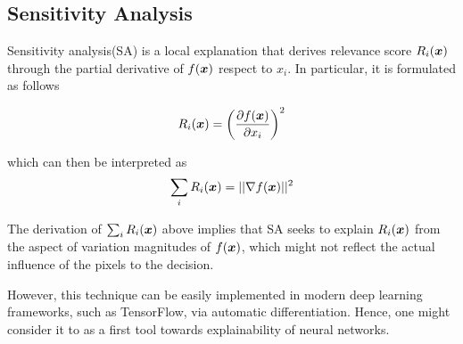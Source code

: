 %

\subsection{Sensitivity Analysis}
Sensitivity analysis(SA)\cite{SimonyanDeepConvolutionalNetworks2013} is a local explanation that derives relevance score $R_i(\boldsymbol{x})$ through the  partial derivative of $f(\patvector{x})$ respect to $x_i$. In particular, it is formulated as follows 

\begin{align}
	R_i(\x) =
	 \bigg( \frac{\partial f(\patvector{x})}{ \partial x_i } \bigg)^2
\end{align}

which can then be interpreted as
\begin{align}
	\sum_i R_i(\x) = || \nabla f(\patvector{x}) ||^2
\end{align}

The derivation of $\sum_i R_i(\boldsymbol{x})$ above implies that SA seeks to explain $R_i(\boldsymbol{x})$ from the aspect of variation magnitudes of $f(\boldsymbol{x})$, which might not reflect the actual influence of the pixels to the decision.

However, this technique can be easily implemented in modern deep learning frameworks, such as TensorFlow\cite{AbadiTensorFlowLargeScaleMachine2016}, via automatic differentiation. Hence, one might consider it to as a first tool towards explainability of neural networks.

